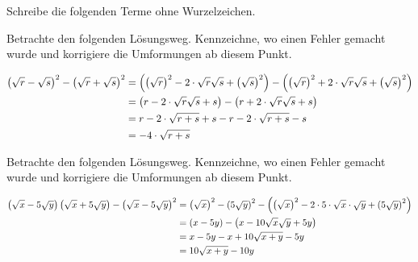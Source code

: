 \documentclass[11pt]{exam}
\begin{document}
\begin{questions}
\question[4]
Schreibe die folgenden Terme ohne Wurzelzeichen.


\question[4]
Betrachte den folgenden Lösungsweg. Kennzeichne, wo einen Fehler gemacht wurde und korrigiere die Umformungen ab diesem Punkt.
\begin{normalsize}
    \begin{align*}
        \left(\sqrt{r}-\sqrt{s}\right)^2-\left(\sqrt{r}+\sqrt{s}\right)^2 &= \left(\left(\sqrt{r}\right)^2-2\cdot\sqrt{r}\sqrt{s}+\left(\sqrt{s}\right)^2\right)-\left(\left(\sqrt{r}\right)^2+2\cdot\sqrt{r}\sqrt{s}+\left(\sqrt{s}\right)^2\right)\\
        &= \left(r-2\cdot\sqrt{r}\sqrt{s}+s\right)-\left(r+2\cdot\sqrt{r}\sqrt{s}+s\right)\\
        &= r-2\cdot\sqrt{r+s}+s-r-2\cdot\sqrt{r+s}-s\\
        &=-4\cdot\sqrt{r+s}
    \end{align*}
\end{normalsize}

\question[3]
Betrachte den folgenden Lösungsweg. Kennzeichne, wo einen Fehler gemacht wurde und korrigiere die Umformungen ab diesem Punkt.
\begin{normalsize}
    \begin{align*}
        \left(\sqrt{x}-5\sqrt{y}\right)\left(\sqrt{x}+5\sqrt{y}\right)-\left(\sqrt{x}-5\sqrt{y}\right)^2 &= \left(\sqrt{x}\right)^2-\left(5\sqrt{y}\right)^2-\left(\left(\sqrt{x}\right)^2-2\cdot5\cdot\sqrt{x}\cdot\sqrt{y}+\left(5\sqrt{y}\right)^2\right) \\
        &= \left(x-5y\right)-\left(x-10\sqrt{x}\sqrt{y}+5y\right) \\
        &= x-5y-x+10\sqrt{x+y}-5y \\
        &= 10\sqrt{x+y}-10y
    \end{align*}
\end{normalsize}



\end{questions}
\end{document}
